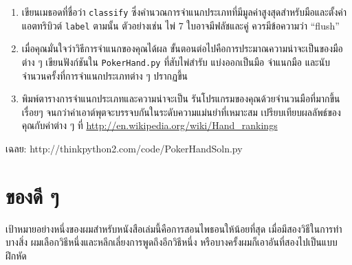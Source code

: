 \begin{exercise}
\begin{enumerate}
\item เขียนเมธอดที่ชื่อว่า {\tt classify} ซึ่งคำนวณการจำแนกประเภทที่มีมูลค่าสูงสุดสำหรับมือและตั้งค่าแอตทริบิวต์ {\tt label} ตามนั้น 
ตัวอย่างเช่น ไพ่ 7 ใบอาจมีฟลัชและคู่ ควรมีข้อความว่า ``flush''

\item เมื่อคุณมั่นใจว่าวิธีการจำแนกของคุณได้ผล ขั้นตอนต่อไปคือการประมาณความน่าจะเป็นของมือต่าง ๆ เขียนฟังก์ชันใน {\tt PokerHand.py} 
ที่สับไพ่สำรับ แบ่งออกเป็นมือ จำแนกมือ และนับจำนวนครั้งที่การจำแนกประเภทต่าง ๆ ปรากฏขึ้น


\item พิมพ์ตารางการจำแนกประเภทและความน่าจะเป็น รันโปรแกรมของคุณด้วยจำนวนมือที่มากขึ้นเรื่อยๆ จนกว่าค่าเอาต์พุตจะบรรจบกันในระดับความแม่นยำที่เหมาะสม 
เปรียบเทียบผลลัพธ์ของคุณกับค่าต่าง ๆ ที่ \url{http://en.wikipedia.org/wiki/Hand_rankings}

\end{enumerate}

เฉลย: http://thinkpython2.com/code/PokerHandSoln.py
\end{exercise}




\chapter{ของดี ๆ} %

เป้าหมายอย่างหนึ่งของผมสำหรับหนังสือเล่มนี้คือการสอนไพธอนให้น้อยที่สุด เมื่อมีสองวิธีในการทำบางสิ่ง 
ผมเลือกวิธีหนึ่งและหลีกเลี่ยงการพูดถึงอีกวิธีหนึ่ง หรือบางครั้งผมก็เอาอันที่สองไปเป็นแบบฝึกหัด


